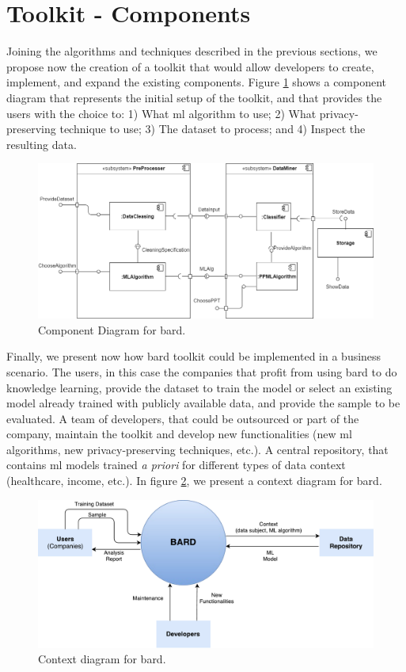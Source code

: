 
\section{Toolkit - Components}
\label{sec:components}

Joining the algorithms and techniques described in the previous sections, we propose now the creation of a toolkit that would allow developers to create, implement, and expand the existing components. Figure \ref{fig:compdiag} shows a component diagram that represents the initial setup of the toolkit, and that provides the users with the choice to: 1) What \ac{ml} algorithm to use; 2) What privacy-preserving technique to use; 3) The dataset to process; and 4) Inspect the resulting data.

\begin{figure}[H]
  \centerline{\includegraphics[width=1.1\textwidth]{images/CompDiagram.png}}
  \caption{Component Diagram for \acs{bard}.}
  \label{fig:compdiag}
\end{figure} 


Finally, we present now how \acs{bard} toolkit could be implemented in a business scenario. The users, in this case the companies that profit from using \ac{bard} to do knowledge learning, provide the dataset to train the model or select an existing model already trained with publicly available data, and provide the sample to be evaluated. A team of developers, that could be outsourced or part of the company, maintain the toolkit and develop new functionalities (new \ac{ml} algorithms, new privacy-preserving techniques, etc.). A central repository, that contains \ac{ml} models trained \textit{a priori} for different types of data context (healthcare, income, etc.). In figure \ref{fig:contextdiag}, we present a context diagram for \acs{bard}.


\begin{figure}[H]
  \centerline{\includegraphics[width=1.1\textwidth]{images/ContextBard.pdf}}
  \caption{Context diagram for \acs{bard}.}
  \label{fig:contextdiag}
\end{figure} 